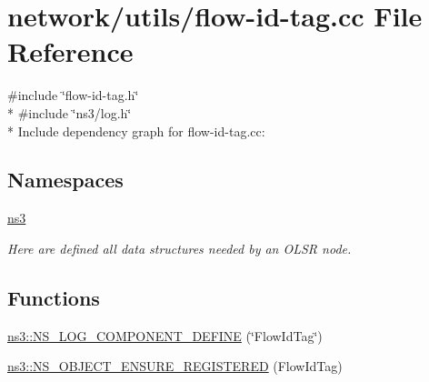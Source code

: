 \hypertarget{flow-id-tag_8cc}{}\section{network/utils/flow-\/id-\/tag.cc File Reference}
\label{flow-id-tag_8cc}
{\ttfamily \#include \char`\"{}flow-\/id-\/tag.\+h\char`\"{}}\\*
{\ttfamily \#include \char`\"{}ns3/log.\+h\char`\"{}}\\*
Include dependency graph for flow-\/id-\/tag.cc\+:
\subsection*{Namespaces}
\begin{DoxyCompactItemize}
\item 
 \hyperlink{namespacens3}{ns3}
\begin{DoxyCompactList}\small\item\em Here are defined all data structures needed by an O\+L\+SR node. \end{DoxyCompactList}\end{DoxyCompactItemize}
\subsection*{Functions}
\begin{DoxyCompactItemize}
\item 
\hyperlink{namespacens3_a24eef1b7675572da1f8aa2ccd3395fe6}{ns3\+::\+N\+S\+\_\+\+L\+O\+G\+\_\+\+C\+O\+M\+P\+O\+N\+E\+N\+T\+\_\+\+D\+E\+F\+I\+NE} (\char`\"{}Flow\+Id\+Tag\char`\"{})
\item 
\hyperlink{namespacens3_a7ece8b6ddc9f2302702034454a4b5feb}{ns3\+::\+N\+S\+\_\+\+O\+B\+J\+E\+C\+T\+\_\+\+E\+N\+S\+U\+R\+E\+\_\+\+R\+E\+G\+I\+S\+T\+E\+R\+ED} (Flow\+Id\+Tag)
\end{DoxyCompactItemize}
